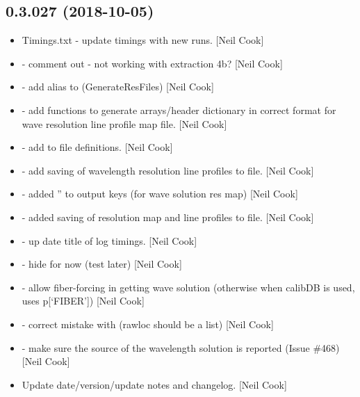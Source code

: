\documentclass[a4paper,10pt,english]{report}
\begin{document}
\subsection{0.3.027 (2018-10-05)}
\label{\detokenize{misc/changelog:id305}}\begin{itemize}
\item {} 
Timings.txt - update timings with new runs. {[}Neil Cook{]}

\item {} 
 - comment out  - not working with
extraction 4b? {[}Neil Cook{]}

\item {} 
 - add alias to 
(GenerateResFiles) {[}Neil Cook{]}

\item {} 
 - add  functions to generate
arrays/header dictionary in correct format for wave resolution line
profile map file. {[}Neil Cook{]}

\item {} 
 - add  to file definitions. {[}Neil Cook{]}

\item {} 
 - add saving of wavelength resolution line
profiles to file. {[}Neil Cook{]}

\item {} 
 - added ” to output keys (for wave solution
res map) {[}Neil Cook{]}

\item {} 
 - added saving of resolution map and line
profiles to file. {[}Neil Cook{]}

\item {} 
 - up date title of log timings. {[}Neil Cook{]}

\item {} 
 - hide   for now (test later) {[}Neil
Cook{]}

\item {} 
 - allow fiber-forcing in getting wave solution
(otherwise when calibDB is used, uses p{[}‘FIBER’{]}) {[}Neil Cook{]}

\item {} 
 - correct mistake with  (rawloc
should be a list) {[}Neil Cook{]}

\item {} 
 - make sure the source of the wavelength solution is
reported (Issue \#468) {[}Neil Cook{]}

\item {} 
Update date/version/update notes and changelog. {[}Neil Cook{]}

\end{itemize}
\end{document}

